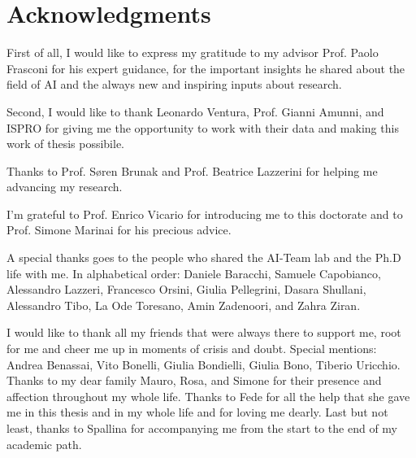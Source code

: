 \section*{Acknowledgments}
First of all, I would like to express my gratitude to my advisor
Prof. Paolo Frasconi for his expert guidance, for the important
insights he shared about the field of AI and the always new and
inspiring inputs about research.

Second, I would like to thank Leonardo Ventura, Prof. Gianni Amunni,
and \mbox{ISPRO} for giving me the opportunity to work with their data and
making this work of thesis possibile.

Thanks to Prof. S{\o}ren Brunak and Prof. Beatrice Lazzerini for
helping me advancing my 
research. 

I’m grateful to Prof. Enrico Vicario for introducing me to this
doctorate and to Prof. Simone Marinai for his precious advice.

A special thanks goes to the people who shared the AI-Team lab and the
Ph.D life with me. In alphabetical order: Daniele Baracchi, Samuele
Capobianco, Alessandro Lazzeri, Francesco Orsini, Giulia Pellegrini,
Dasara Shullani,
Alessandro Tibo, La Ode Toresano, Amin Zadenoori, and Zahra Ziran.

I would like to thank all my friends that were always there to support
me, root for me and cheer me up in moments of crisis and
doubt. Special mentions: Andrea Benassai, Vito Bonelli, Giulia
Bondielli, Giulia Bono, Tiberio Uricchio. Thanks to my dear family
Mauro, Rosa, and Simone for their presence and affection throughout my
whole life. Thanks to Fede for all the help that she gave me in this
thesis and in my whole life and for loving me dearly. Last but not
least, thanks to Spallina for accompanying me from the start to the
end of my academic path.

